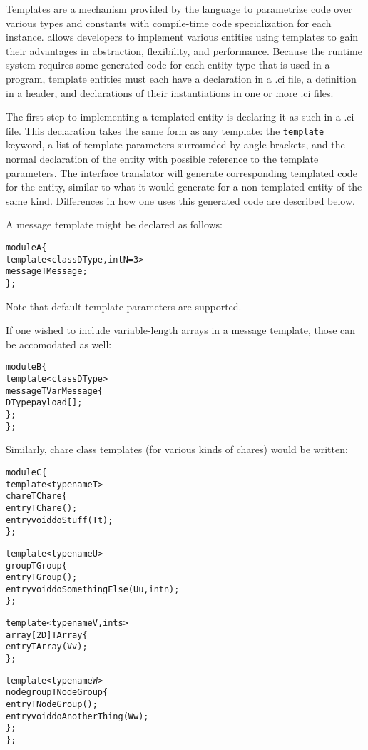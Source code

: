 


Templates are a mechanism provided by the \CC language to parametrize code over
various types and constants with compile-time code specialization for each
instance. \charmpp allows developers to implement various entities using \CC
templates to gain their advantages in abstraction, flexibility, and
performance. Because the \charmpp runtime system requires some generated code
for each entity type that is used in a program, template entities must each
have a declaration in a .ci file, a definition in a \CC header, and
declarations of their instantiations in one or more .ci files.


The first step to implementing a templated \charmpp entity is declaring it as
such in a .ci file. This declaration takes the same form as any \CC template:
the {\tt template} keyword, a list of template parameters surrounded by angle
brackets, and the normal declaration of the entity with possible reference to
the template parameters. The \charmpp interface translator will generate
corresponding templated code for the entity, similar to what it would generate
for a non-templated entity of the same kind. Differences in how one uses this
generated code are described below.

A message template might be declared as follows:
\begin{alltt}
module A \{
  template <class DType, int N=3>
  message TMessage;
\};
\end{alltt}
Note that default template parameters are supported.

If one wished to include variable-length arrays in a message template, those
can be accomodated as well:
\begin{alltt}
module B \{
  template <class DType>
  message TVarMessage \{
    DType payload[];
  \};
\};
\end{alltt}

Similarly, chare class templates (for various kinds of chares) would be
written:
\begin{alltt}
module C \{
  template <typename T>
  chare TChare \{
    entry TChare();
    entry void doStuff(T t);
  \};

  template <typename U>
  group TGroup \{
    entry TGroup();
    entry void doSomethingElse(U u, int n);
  \};

  template <typename V, int s>
  array [2D] TArray \{
    entry TArray(V v);
  \};

  template <typename W>
  nodegroup TNodeGroup \{
    entry TNodeGroup();
    entry void doAnotherThing(W w);
  \};
\};
\end{alltt}

